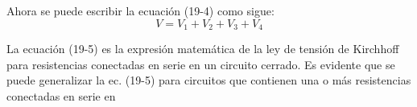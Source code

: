 \documentclass{article}
\begin{document}
Ahora se puede escribir la ecuación (19-4) como sigue:
\[
V = V_1 + V_2 + V_3 + V_4
\tag{19-5}
\]

La ecuación (19-5) es la expresión matemática de la ley de tensión de Kirchhoff para resistencias conectadas en serie en un circuito cerrado. Es evidente que se puede generalizar la ec. (19-5) para circuitos que contienen una o más resistencias conectadas en serie en
\end{document}
